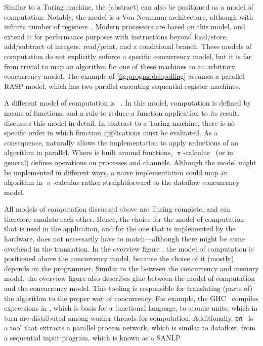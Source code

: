 Similar to a Turing machine, the (abstract)  can also be positioned as a model of computation.
Notably, the  model is a Von Neumann architecture, although with infinite number of registers~\cite{cook:rasp}.
Modern processors are based on this model, and extend it for performance purposes with instructions beyond load/store, add/subtract of integers, read/print, and a conditional branch.
These models of computation do not explicitly enforce a specific concurrency model, but it is far from trivial to map an algorithm for one of these machines to an arbitrary concurrency model.
The example of \vref{fig:progmodel:polling} assumes a parallel \ac{RASP} model, which has two parallel executing sequential register machines.

A different model of computation is \lcalc*~\cite{church:unsolvable}.
In this model, computation is defined by means of functions, and a rule to reduce a function application to its result.
 discusses this model in detail.
In contrast to a Turing machine, there is no specific order in which function applications must be evaluated.
As a consequence, \lcalc naturally allows the implementation to apply reductions of an algorithm in parallel.
Where \lcalc is built around functions, $\uppi$-calculus~\cite{milner:pi_calculus} (or  in general) defines operations on processes and channels.
Although the model might be implemented in different ways, a naive implementation could map an algorithm in $\uppi$-calculus rather straightforward to the dataflow concurrency model.

All models of computation discussed above are Turing complete, and can therefore emulate each other.
Hence, the choice for the model of computation that is used in the application, and for the one that is implemented by the hardware, does not necessarily have to match---although there might be some overhead in the translation.
In the overview figure \chapfigpageref, the model of computation is positioned above the concurrency model, because the choice of it (mostly) depends on the programmer.
Similar to the  between the concurrency and memory model, the overview figure also describes glue between the model of computation and the concurrency model.
This tooling is responsible for translating (parts of) the algorithm to the proper way of concurrency.
For example, the \ac{GHC}~\cite{ghc} compiles expressions in \lcalc, which is basis for a functional language, to atomic units, which in turn are distributed among worker threads for computation.
Additionally, \texttt{pn}~\cite{verdoolaege:pn} is a tool that extracts a parallel process network, which is similar to dataflow, from a sequential input program, which is known as a \ac{SANLP}.


